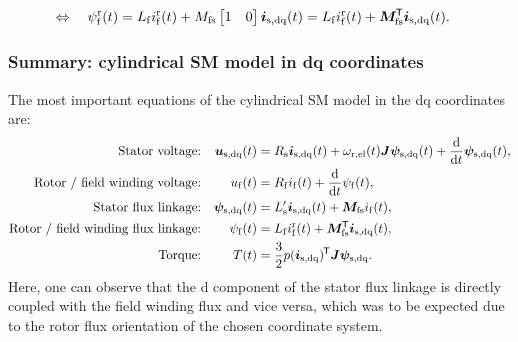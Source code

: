 \begin{frame}
\begin{equation}
\begin{split}
			 \\
			 \Leftrightarrow \quad \psi^\mathrm{r}_\mathrm{f}(t) &= L_\mathrm{f} i^\mathrm{r}_\mathrm{f}(t) + M_\mathrm{fs} \begin{bmatrix}1 & 0\end{bmatrix} \bm{i}_\mathrm{s,dq}(t)= L_\mathrm{f} i^\mathrm{r}_\mathrm{f}(t) + \bm{M}^{\mkern-1.5mu\mathsf{T}}_\mathrm{fs} \bm{i}_\mathrm{s,dq}(t).
		\end{split}
	\end{equation}
\end{frame}

\begin{frame}
	\frametitle{Summary: cylindrical SM model in dq coordinates}
    The most important equations of the cylindrical SM model in the  dq coordinates are:
    \begin{equation*}
        \begin{alignedat}{4}
            &&\mbox{Stator voltage:}&& \quad\bm{u}_\mathrm{s,dq}(&t) &&= R_\mathrm{s} \bm{i}_\mathrm{s,dq}(t)+ \omega_\mathrm{r,el}(t)\bm{J}\bm{\psi}_\mathrm{s,dq}(t) + \frac{\mathrm{d}}{\mathrm{d}t}\bm{\psi}_\mathrm{s,dq}(t),\\
			&&\mbox{Rotor / field winding  voltage:}&& \quad u_\mathrm{f}(&t) &&= R_\mathrm{f}i_\mathrm{f}(t)+\frac{\mathrm{d}}{\mathrm{d}t}\psi_\mathrm{f}(t),\\
			&&\mbox{Stator flux linkage:}&& \quad \bm{\psi}_\mathrm{s,dq}(&t) &&= L'_\mathrm{s} \bm{i}_\mathrm{s,dq}(t) + \bm{M}_\mathrm{fs} i_{\mathrm{f}}(t),\\
			&&\mbox{Rotor / field winding flux linkage:}&& \psi_\mathrm{f}(&t) &&= L_\mathrm{f} i^\mathrm{r}_\mathrm{f}(t) + \bm{M}^{\mkern-1.5mu\mathsf{T}}_\mathrm{fs} \bm{i}_\mathrm{s,dq}(t),\\
			&&\mbox{Torque:}&& \quad T(&t) &&= \frac{3}{2} p (\bm{i}_\mathrm{s,dq})^{\mkern-1.5mu\mathsf{T}}\bm{J}\bm{\psi}_\mathrm{s,dq}.
        \end{alignedat}
    \end{equation*}
	Here, one can observe that the d component of the stator flux linkage is directly coupled with the field winding flux and vice versa, which was to be expected due to the rotor flux orientation of the chosen coordinate system.  
\end{frame}

